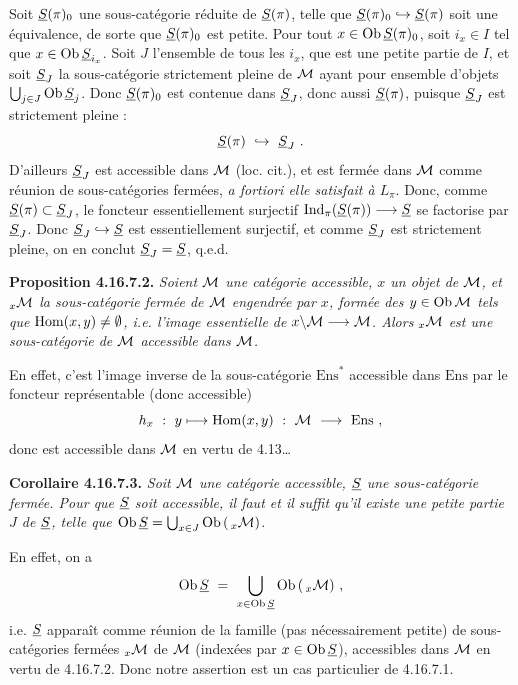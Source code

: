 Soit $\underline{S}(\pi)_0$ une sous-catégorie réduite de $\underline{S}(\pi)$, telle que $\underline{S}(\pi)_0 \hookrightarrow \underline{S}(\pi)$ soit une équivalence, de sorte que $\underline{S}(\pi)_0$ est petite. Pour tout $x \in \operatorname{Ob} \underline{S}(\pi)_0$, soit $i_x \in I$ tel que $x \in \operatorname{Ob} \underline{S}_{i_x}$. Soit $J$ l'ensemble de tous les $i_x$, que est une petite partie de $I$, et soit $\underline{S}_J$ la sous-catégorie strictement pleine de $\mathcal{M}$ ayant pour ensemble d'objets $\bigcup_{j\in J} \operatorname{Ob} \underline{S}_j$. Donc $\underline{S}(\pi)_0$ est contenue dans $\underline{S}_J$, donc aussi $\underline{S}(\pi)$, puisque $\underline{S}_J$ est strictement pleine : %
\[
\underline{S}(\pi) \ \hookrightarrow\ \underline{S}_J \ .
\]
D'ailleurs $\underline{S}_J$ est accessible dans $\mathcal{M}$ (loc. cit.), et est fermée dans $\mathcal{M}$ comme réunion de sous-catégories fermées, \textit{a fortiori elle satisfait à $L_\pi$}. Donc, comme $\underline{S}(\pi) \subset \underline{S}_J$, le foncteur essentiellement surjectif $\operatorname{Ind}_\pi(\underline{S}(\pi)) \longrightarrow \underline{S}$ se factorise par $\underline{S}_J$. Donc $\underline{S}_J \hookrightarrow \underline{S}$ est essentiellement surjectif, et comme $\underline{S}_J$ est strictement pleine, on en conclut $\underline{S}_J = \underline{S}$, q.e.d.

\textbf{Proposition 4.16.7.2.} \textit{Soient $\mathcal{M}$ une catégorie accessible, $x$ un objet de $\mathcal{M}$, et ${}_x\mathcal{M}$ la sous-catégorie fermée de $\mathcal{M}$ engendrée par $x$, formée des $y \in \operatorname{Ob} \mathcal{M}$ tels que $\operatorname{Hom}(x,y) \neq \emptyset$, i.e. l'image essentielle de $x\backslash\mathcal{M} \longrightarrow \mathcal{M}$. Alors ${}_x\mathcal{M}$ est une sous-catégorie de $\mathcal{M}$ accessible dans $\mathcal{M}$.}

En effet, c'est l'image inverse de la sous-catégorie $\mathrm{Ens}^*$ accessible dans $\mathrm{Ens}$ par le foncteur représentable (donc accessible)
\[
h_x \ :\ y \longmapsto \Hom(x,y) \ :\ \cM \ \longrightarrow\ \mathrm{Ens} \ ,
\]
donc est accessible dans $\mathcal{M}$ en vertu de 4.13\dots

\textbf{Corollaire 4.16.7.3.} \textit{Soit $\mathcal{M}$ une catégorie accessible, $\underline{S}$ une sous-catégorie fermée. Pour que $\underline{S}$ soit accessible, il faut et il suffit qu'il existe une \textup{petite} partie $J$ de $\underline{S}$, telle que $\operatorname{Ob} \underline{S} = \bigcup_{x\in J} \operatorname{Ob}\,(\,{}_x\mathcal{M})$.}

En effet, on a
\[
\Ob \uS \ =\ \bigcup_{x\in\Ob\uS} \Ob\,(\,{}_x\cM) \ ,
\]
i.e. $\underline{S}$ apparaît comme réunion de
la famille (pas nécessairement petite) de sous-catégories fermées ${}_x\mathcal{M}$ de $\mathcal{M}$ (indexées par $x \in \operatorname{Ob} \underline{S}$), accessibles dans $\mathcal{M}$ en vertu de 4.16.7.2. Donc notre assertion est un cas particulier de 4.16.7.1.

